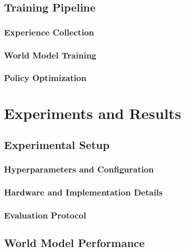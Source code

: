 \documentclass[
	english,
	ruledheaders=section,
	class=report,
	thesis={type=master},
	accentcolor=9c,
	custommargins=true,
	marginpar=false,
	parskip=half-,
	fontsize=11pt,
]{tudapub}
\begin{document}
\section{Training Pipeline}
\label{sec:training_pipeline}

\subsection{Experience Collection}
\label{subsec:experience_collection}

\subsection{World Model Training}
\label{subsec:world_model_training}

\subsection{Policy Optimization}
\label{subsec:policy_optimization}

\chapter{Experiments and Results}
\label{chap:experiments}

\section{Experimental Setup}
\label{sec:exp_setup}

\subsection{Hyperparameters and Configuration}
\label{subsec:hyperparameters}

\subsection{Hardware and Implementation Details}
\label{subsec:hardware}

\subsection{Evaluation Protocol}
\label{subsec:eval_protocol}

\section{World Model Performance}
\label{sec:world_model_perf}
\end{document}
